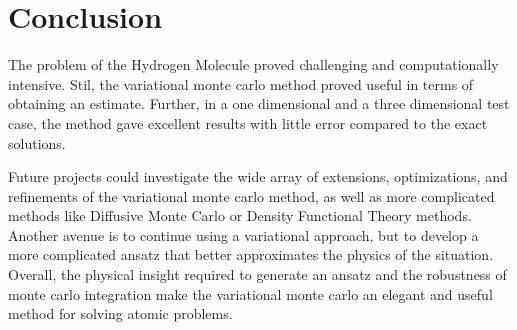 \documentclass[12pt]{article}
\numberwithin{equation}{section}
\begin{document}
\section{Conclusion}
The problem of the Hydrogen Molecule proved challenging and computationally intensive.  Stil, the variational monte carlo method proved useful in terms of obtaining an estimate.  Further, in a one dimensional and a three dimensional test case, the method gave excellent results with little error compared to the exact solutions.

Future projects could investigate the wide array of extensions, optimizations, and refinements of the variational monte carlo method, as well as more complicated methods like Diffusive Monte Carlo or Density Functional Theory methods.  Another avenue is to continue using a variational approach, but to develop a more complicated ansatz that better approximates the physics of the situation.  Overall, the physical insight required to generate an ansatz and the robustness of monte carlo integration make the variational monte carlo an elegant and useful method for solving atomic problems.

{}
\end{document}
